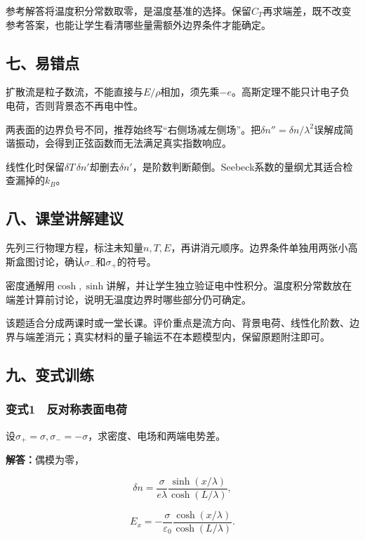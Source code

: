 \documentclass[12pt,a4paper,fontset=fandol]{ctexart}
\begin{document}
参考解答将温度积分常数取零，是温度基准的选择。保留\(C_T\)再求端差，既不改变参考答案，也能让学生看清哪些量需额外边界条件才能确定。

\subsection{七、易错点}\label{ux4e03ux6613ux9519ux70b9-5}

扩散流是粒子数流，不能直接与\(E/\rho\)相加，须先乘\(-e\)。高斯定理不能只计电子负电荷，否则背景态不再电中性。

两表面的边界负号不同，推荐始终写``右侧场减左侧场''。把\(\delta n''=\delta n/\lambda^2\)误解成简谐振动，会得到正弦函数而无法满足真实指数响应。

线性化时保留\(\delta T\,\delta n'\)却删去\(\delta n'\)，是阶数判断颠倒。Seebeck系数的量纲尤其适合检查漏掉的\(k_B\)。

\subsection{八、课堂讲解建议}\label{ux516bux8bfeux5802ux8bb2ux89e3ux5efaux8bae-5}

先列三行物理方程，标注未知量\(n,T,E\)，再讲消元顺序。边界条件单独用两张小高斯盒图讨论，确认\(\sigma_-\)和\(\sigma_+\)的符号。

密度通解用\(\cosh,\sinh\)讲解，并让学生独立验证电中性积分。温度积分常数放在端差计算前讨论，说明无温度边界时哪些部分仍可确定。

该题适合分成两课时或一堂长课。评价重点是流方向、背景电荷、线性化阶数、边界与端差消元；真实材料的量子输运不在本题模型内，保留原题附注即可。

\subsection{九、变式训练}\label{ux4e5dux53d8ux5f0fux8badux7ec3-5}

\subsubsection{变式1　反对称表面电荷}\label{ux53d8ux5f0f1-ux53cdux5bf9ux79f0ux8868ux9762ux7535ux8377}

设\(\sigma_+=\sigma,\sigma_-=-\sigma\)，求密度、电场和两端电势差。

\textbf{解答：}偶模为零，

\[
\delta n=\frac{\sigma}{e\lambda}
\frac{\sinh(x/\lambda)}{\cosh(L/\lambda)},
\]

\[
E_x=-\frac{\sigma}{\varepsilon_0}
\frac{\cosh(x/\lambda)}{\cosh(L/\lambda)}.
\]
\end{document}

